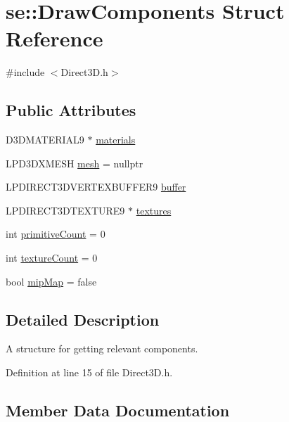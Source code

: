 \hypertarget{structse_1_1_draw_components}{}\section{se\+:\+:Draw\+Components Struct Reference}
\label{structse_1_1_draw_components}


{\ttfamily \#include $<$Direct3\+D.\+h$>$}

\subsection*{Public Attributes}
\begin{DoxyCompactItemize}
\item 
D3\+D\+M\+A\+T\+E\+R\+I\+A\+L9 $\ast$ \mbox{\hyperlink{structse_1_1_draw_components_a6e72bd7d854097cd4371c8b5dbdaed87}{materials}}
\item 
L\+P\+D3\+D\+X\+M\+E\+SH \mbox{\hyperlink{structse_1_1_draw_components_ad8dbb551cea22f21b227cb37e4b43f95}{mesh}} = nullptr
\item 
L\+P\+D\+I\+R\+E\+C\+T3\+D\+V\+E\+R\+T\+E\+X\+B\+U\+F\+F\+E\+R9 \mbox{\hyperlink{structse_1_1_draw_components_ab98ae9279575ab342380577a2a1d83d1}{buffer}}
\item 
L\+P\+D\+I\+R\+E\+C\+T3\+D\+T\+E\+X\+T\+U\+R\+E9 $\ast$ \mbox{\hyperlink{structse_1_1_draw_components_a5853cbdf5f707c4cd3cffb09678cfe18}{textures}}
\item 
int \mbox{\hyperlink{structse_1_1_draw_components_af74ab24e473de232a1df0166109cbafd}{primitive\+Count}} = 0
\item 
int \mbox{\hyperlink{structse_1_1_draw_components_a4a4323bb918073fe2c6cf45ee3c885d2}{texture\+Count}} = 0
\item 
bool \mbox{\hyperlink{structse_1_1_draw_components_af32638734af65bd440b7776a7e1694e0}{mip\+Map}} = false
\end{DoxyCompactItemize}


\subsection{Detailed Description}
A structure for getting relevant components. 

Definition at line 15 of file Direct3\+D.\+h.



\subsection{Member Data Documentation}
\mbox{\label{structse_1_1_draw_components_ab98ae9279575ab342380577a2a1d83d1}} 

